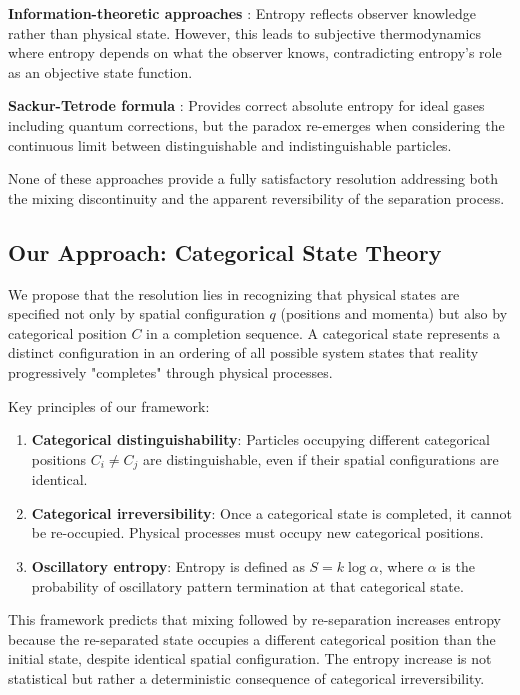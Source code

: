 \documentclass[12pt,a4paper]{article}
\theoremstyle{remark}
\begin{document}
\textbf{Information-theoretic approaches} \cite{jaynes1992gibbs,ben2008comment}: Entropy reflects observer knowledge rather than physical state. However, this leads to subjective thermodynamics where entropy depends on what the observer knows, contradicting entropy's role as an objective state function.

\textbf{Sackur-Tetrode formula} \cite{sackur1911anwendung,tetrode1912chemische}: Provides correct absolute entropy for ideal gases including quantum corrections, but the paradox re-emerges when considering the continuous limit between distinguishable and indistinguishable particles.

None of these approaches provide a fully satisfactory resolution addressing both the mixing discontinuity and the apparent reversibility of the separation process.

\subsection{Our Approach: Categorical State Theory}

We propose that the resolution lies in recognizing that physical states are specified not only by spatial configuration $q$ (positions and momenta) but also by categorical position $C$ in a completion sequence. A categorical state represents a distinct configuration in an ordering of all possible system states that reality progressively "completes" through physical processes.

Key principles of our framework:

\begin{enumerate}
\item \textbf{Categorical distinguishability}: Particles occupying different categorical positions $C_i \neq C_j$ are distinguishable, even if their spatial configurations are identical.

\item \textbf{Categorical irreversibility}: Once a categorical state is completed, it cannot be re-occupied. Physical processes must occupy new categorical positions.

\item \textbf{Oscillatory entropy}: Entropy is defined as $S = k \log \alpha$, where $\alpha$ is the probability of oscillatory pattern termination at that categorical state.
\end{enumerate}

This framework predicts that mixing followed by re-separation increases entropy because the re-separated state occupies a different categorical position than the initial state, despite identical spatial configuration. The entropy increase is not statistical but rather a deterministic consequence of categorical irreversibility.
\end{document}
